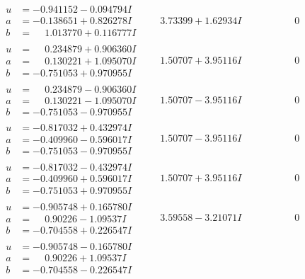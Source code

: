 \documentclass[1p]{elsarticle_modified}
\theoremstyle{definition}
\begin{document}
$$\begin{array}{c|c|c}
\begin{aligned}
u &= -0.941152 - 0.094794 I \\
a &= -0.138651 + 0.826278 I \\
b &= \phantom{-}1.013770 + 0.116777 I\end{aligned}
 & \phantom{-}3.73399 + 1.62934 I & \phantom{-0.000000 } 0 \\ \hline\begin{aligned}
u &= \phantom{-}0.234879 + 0.906360 I \\
a &= \phantom{-}0.130221 + 1.095070 I \\
b &= -0.751053 + 0.970955 I\end{aligned}
 & \phantom{-}1.50707 + 3.95116 I & \phantom{-0.000000 } 0 \\ \hline\begin{aligned}
u &= \phantom{-}0.234879 - 0.906360 I \\
a &= \phantom{-}0.130221 - 1.095070 I \\
b &= -0.751053 - 0.970955 I\end{aligned}
 & \phantom{-}1.50707 - 3.95116 I & \phantom{-0.000000 } 0 \\ \hline\begin{aligned}
u &= -0.817032 + 0.432974 I \\
a &= -0.409960 - 0.596017 I \\
b &= -0.751053 - 0.970955 I\end{aligned}
 & \phantom{-}1.50707 - 3.95116 I & \phantom{-0.000000 } 0 \\ \hline\begin{aligned}
u &= -0.817032 - 0.432974 I \\
a &= -0.409960 + 0.596017 I \\
b &= -0.751053 + 0.970955 I\end{aligned}
 & \phantom{-}1.50707 + 3.95116 I & \phantom{-0.000000 } 0 \\ \hline\begin{aligned}
u &= -0.905748 + 0.165780 I \\
a &= \phantom{-}0.90226 - 1.09537 I \\
b &= -0.704558 + 0.226547 I\end{aligned}
 & \phantom{-}3.59558 - 3.21071 I & \phantom{-0.000000 } 0 \\ \hline\begin{aligned}
u &= -0.905748 - 0.165780 I \\
a &= \phantom{-}0.90226 + 1.09537 I \\
b &= -0.704558 - 0.226547 I\end{aligned}

\end{array}$$
\end{document}
